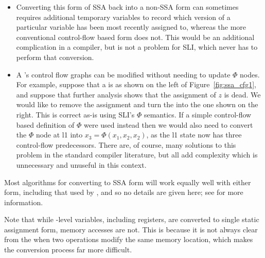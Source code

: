 \begin{itemize}
\item
  Converting this form of SSA back into a non-SSA form can sometimes
  requires additional temporary variables to record which version of a
  particular variable has been most recently assigned to, whereas the
  more conventional control-flow based form does not.  This would be
  an additional complication in a compiler, but is not a problem for
  SLI, which never has to perform that conversion.
\item
  A {\StateMachine}'s control flow graphs can be modified without
  needing to update $\Phi$ nodes.  For example, suppose that a
  {\StateMachine} is as shown on the left of
  Figure~\ref{fig:ssa_cfg1}, and suppose that further analysis shows
  that the assignment of $z$ is dead.  We would like to remove the
  assignment and turn the {\StateMachine} into the one shown on the
  right.  This is correct as-is using SLI's $\Phi$ semantics.  If a
  simple control-flow based definition of $\Phi$ were used instead
  then we would also need to convert the $\Phi$ node at l1 into $x_3 =
  \Phi(x_1, x_2, x_2)$, as the l1 state now has three control-flow
  predecessors.  There are, of course, many solutions to this problem
  in the standard compiler literature\needCite{}, but all add
  complexity which is unnecessary and unuseful in this context.
\end{itemize}

Most algorithms for converting to SSA form will work equally well with
either form, including that used by \implementation, and so no details
are given here; see \needCite{} for more information.


Note that while {\StateMachine}-level variables, including registers,
are converted to single static assignment form, memory accesses are
not.  This is because it is not always clear from the {\StateMachine}
when two  operations modify the same memory location,
which makes the conversion process far more difficult.  



